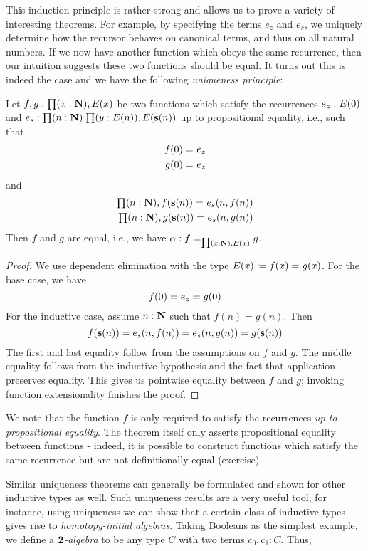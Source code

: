 This induction principle is rather strong and allows us to prove a variety of interesting theorems. For example, by specifying the terms $e_z$ and $e_s$, we  uniquely determine how the recursor behaves on canonical terms, and thus on all natural numbers. If we now have another function which obeys the same recurrence, then our intuition suggests these two functions should be equal. It turns out this is indeed the case and we have the following \emph{uniqueness principle}:

\begin{thm}
Let $f,g : \prd{x:\nat} E(x)$ be two functions which satisfy the recurrences $e_z : E(0)$ and $e_s : \prd{n : \nat}{y : E(n)} E(\s(n))$ up to propositional equality, i.e., such that
\begin{align*}
f(0) =_{} e_z \\ 
g(0) =_{} e_z
\end{align*}
and 
\begin{align*}
\prd{n : \nat} \id{f(\s(n))}{e_s(n, f(n))} \\
\prd{n : \nat} \id{g(\s(n))}{e_s(n, g(n))}
\end{align*}
Then $f$ and $g$ are equal, i.e., we have $\alpha : \id[\prd{x :\nat} E(x)]{f}{g}$. 
\end{thm}

\begin{proof}
We use dependent elimination with the type $E(x) \coloneqq f(x) =_{} g(x)$. For the base case, we have \[f(0) = e_z = g(0)\]
For the inductive case, assume $n : \mathbf{N}$ such that $f(n) = g(n)$. Then
\[ f(\mathbf{s}(n)) = e_s(n, f(n)) = e_s(n, g(n)) = g(\mathbf{s}(n)) \]
The first and last equality follow from the assumptions on $f$ and $g$. The middle equality follows from the inductive hypothesis and the fact that application preserves equality. This gives us pointwise equality between $f$ and $g$; invoking function extensionality finishes the proof.
\end{proof}
We note that the function $f$ is only required to satisfy the recurrences \emph{up to propositional equality}. The theorem itself only asserts propositional equality between functions - indeed, it is possible to construct functions which satisfy the same recurrence but are not definitionally equal (exercise). 

Similar uniqueness theorems can generally be formulated and shown for other inductive types as well. Such uniqueness results are a very useful tool; for instance, using uniqueness we can show that a certain class of inductive types gives rise to \emph{homotopy-initial algebras}. Taking Booleans as the simplest example, we define a \emph{$\mathbf{2}$-algebra} to be any type $C$ with two terms $c_0, c_1 : C$. Thus,

